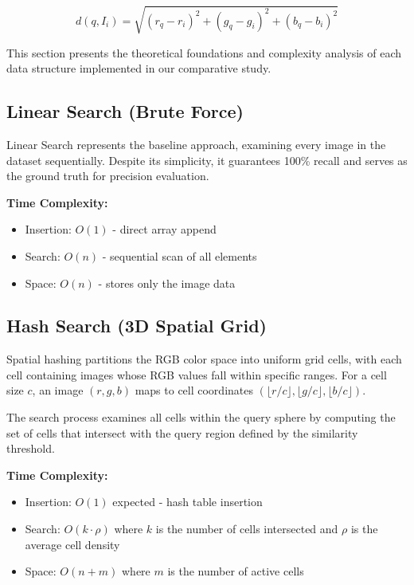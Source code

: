 \documentclass{sbc2023}
\begin{document}
\begin{equation}
d(q, I_i) = \sqrt{(r_q - r_i)^2 + (g_q - g_i)^2 + (b_q - b_i)^2}
\label{eq:euclidean_distance}
\end{equation}

This section presents the theoretical foundations and complexity analysis of each data structure implemented in our comparative study.

\subsection{Linear Search (Brute Force)}

Linear Search represents the baseline approach, examining every image in the dataset sequentially. Despite its simplicity, it guarantees 100\% recall and serves as the ground truth for precision evaluation.

\textbf{Time Complexity:}
\begin{itemize}
    \item Insertion: $O(1)$ - direct array append
    \item Search: $O(n)$ - sequential scan of all elements
    \item Space: $O(n)$ - stores only the image data
\end{itemize}

\subsection{Hash Search (3D Spatial Grid)}

Spatial hashing partitions the RGB color space into uniform grid cells, with each cell containing images whose RGB values fall within specific ranges. For a cell size $c$, an image $(r, g, b)$ maps to cell coordinates $(\lfloor r/c \rfloor, \lfloor g/c \rfloor, \lfloor b/c \rfloor)$.

The search process examines all cells within the query sphere by computing the set of cells that intersect with the query region defined by the similarity threshold.

\textbf{Time Complexity:}
\begin{itemize}
    \item Insertion: $O(1)$ expected - hash table insertion
    \item Search: $O(k \cdot \rho)$ where $k$ is the number of cells intersected and $\rho$ is the average cell density
    \item Space: $O(n + m)$ where $m$ is the number of active cells
\end{itemize}
\end{document}
